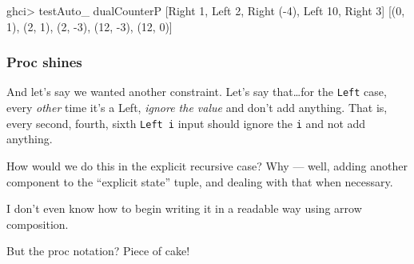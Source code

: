 \documentclass[]{article}
\newenvironment{Shaded}{}{}
\newcommand{\DataTypeTok}[1]{\textcolor[rgb]{0.56,0.13,0.00}{{#1}}}
\newcommand{\DecValTok}[1]{\textcolor[rgb]{0.25,0.63,0.44}{{#1}}}
\newcommand{\FunctionTok}[1]{\textcolor[rgb]{0.02,0.16,0.49}{{#1}}}
\newcommand{\NormalTok}[1]{{#1}}
\begin{document}
\begin{Shaded}
\begin{Highlighting}[]
\NormalTok{ghci}\FunctionTok{>} \NormalTok{testAuto_ dualCounterP [}\DataTypeTok{Right} \DecValTok{1}\NormalTok{, }\DataTypeTok{Left} \DecValTok{2}\NormalTok{, }\DataTypeTok{Right} \NormalTok{(}\FunctionTok{-}\DecValTok{4}\NormalTok{), }\DataTypeTok{Left} \DecValTok{10}\NormalTok{, }\DataTypeTok{Right} \DecValTok{3}\NormalTok{]}
\NormalTok{[(}\DecValTok{0}\NormalTok{, }\DecValTok{1}\NormalTok{), (}\DecValTok{2}\NormalTok{, }\DecValTok{1}\NormalTok{), (}\DecValTok{2}\NormalTok{, }\FunctionTok{-}\DecValTok{3}\NormalTok{), (}\DecValTok{12}\NormalTok{, }\FunctionTok{-}\DecValTok{3}\NormalTok{), (}\DecValTok{12}\NormalTok{, }\DecValTok{0}\NormalTok{)]}
\end{Highlighting}
\end{Shaded}

\subsubsection{Proc shines}\label{proc-shines}

And let's say we wanted another constraint. Let's say that\ldots{}for
the \texttt{Left} case, every \emph{other} time it's a Left,
\emph{ignore the value} and don't add anything. That is, every second,
fourth, sixth \texttt{Left\ i} input should ignore the \texttt{i} and
not add anything.

How would we do this in the explicit recursive case? Why --- well,
adding another component to the ``explicit state'' tuple, and dealing
with that when necessary.

I don't even know how to begin writing it in a readable way using arrow
composition.

But the proc notation? Piece of cake!
\end{document}
